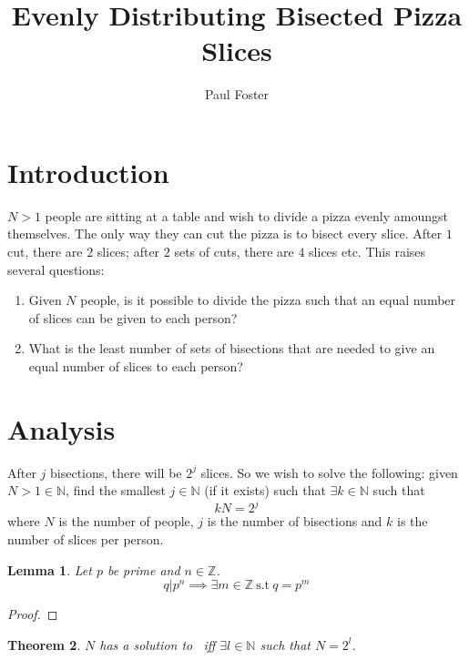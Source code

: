 \documentclass{article}
\title{Evenly Distributing Bisected Pizza Slices}
\author{Paul Foster}
\begin{document}
\maketitle

\newtheorem{theorem}{Theorem}
\newtheorem{corollary}{Corollary}[theorem]
\newtheorem{lemma}[theorem]{Lemma}

\section{Introduction}
$N>1$ people are sitting at a table and wish to divide a pizza evenly amoungst themselves. The only way they can cut the pizza is to bisect every slice. After $1$ cut, there are $2$ slices; after $2$ sets of cuts, there are $4$ slices etc. This raises several questions:
\begin{enumerate}
  \item Given $N$ people, is it possible to divide the pizza such that an equal number of slices can be given to each person?
  \item What is the least number of sets of bisections that are needed to give an equal number of slices to each person?
\end{enumerate}

\section{Analysis}
After $j$ bisections, there will be $2^j$ slices. So we wish to solve the following: given $N>1 \in \mathbb{N}$, find the smallest $j \in \mathbb{N}$ (if it exists) such that $\exists k \in \mathbb{N}$ such that
\begin{equation} \label{eq:1}
  kN = 2^j
\end{equation}
where $N$ is the number of people, $j$ is the number of bisections and $k$ is the number of slices per person.

\begin{lemma} \label{lem:1}
Let $p$ be prime and $n \in \mathbb{Z}$.
\begin{equation}
  q | p^n \implies \exists m \in \mathbb{Z}~\text{s.t}~q = p^m
\end{equation}
\end{lemma}

\begin{proof}
\end{proof}

\begin{theorem}
$N$ has a solution to~ iff $\exists l \in \mathbb{N}$ such that $N = 2^l$.
\end{theorem}
\end{document}

